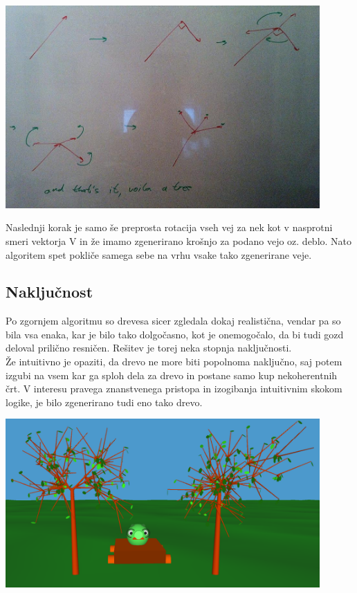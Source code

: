 \documentclass[10pt,a4paper,oneside]{book}
\def\pa{\\[-6pt]}
\begin{document}
\begin{center}
\includegraphics[width=12cm]{algorithmsketch.jpg}
\end{center}

Naslednji korak je samo še preprosta rotacija vseh vej za nek kot v
nasprotni smeri vektorja V in že imamo zgenerirano krošnjo za podano
vejo oz. deblo. Nato algoritem spet pokliče samega sebe na vrhu vsake
tako zgenerirane veje.

\subsection{Naključnost}
Po zgornjem algoritmu so drevesa sicer zgledala dokaj realistična,
vendar pa so bila vsa enaka, kar je bilo tako dolgočasno, kot je
onemogočalo, da bi tudi gozd deloval prilično resničen. Rešitev je
torej neka stopnja naključnosti.\pa

Že intuitivno je opaziti, da drevo ne more biti popolnoma naključno,
saj potem izgubi na vsem kar ga sploh dela za drevo in postane samo
kup nekoherentnih črt. V interesu pravega znanstvenega pristopa in
izogibanja intuitivnim skokom logike, je bilo zgenerirano tudi eno
tako drevo.

\begin{center}
\includegraphics[width=12cm]{randomtree.png}
\end{center}
\end{document}

